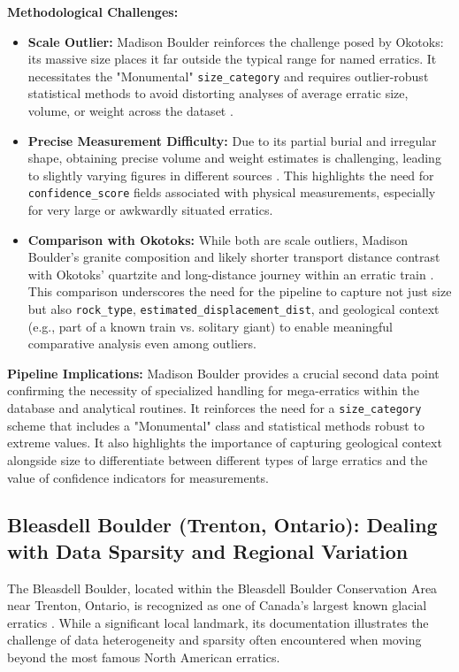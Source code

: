 \documentclass[
11pt, %
english, %
singlespacing, %
headsepline, %
]{MastersDoctoralThesis} %
\begin{document}
\textbf{Methodological Challenges:}
\begin{itemize}
    \item \textbf{Scale Outlier:} Madison Boulder reinforces the challenge posed by Okotoks: its massive size places it far outside the typical range for named erratics. It necessitates the "Monumental" \texttt{size\_category} and requires outlier-robust statistical methods to avoid distorting analyses of average erratic size, volume, or weight across the dataset \cite{Cuffey2010}.
    \item \textbf{Precise Measurement Difficulty:} Due to its partial burial and irregular shape, obtaining precise volume and weight estimates is challenging, leading to slightly varying figures in different sources \cite{NHMadisonBoulder, NPSMadisonBoulder}. This highlights the need for \texttt{confidence\_score} fields associated with physical measurements, especially for very large or awkwardly situated erratics.
    \item \textbf{Comparison with Okotoks:} While both are scale outliers, Madison Boulder's granite composition and likely shorter transport distance contrast with Okotoks' quartzite and long-distance journey within an erratic train \cite{AlbertaOkotoks, Goldthwait1925}. This comparison underscores the need for the pipeline to capture not just size but also \texttt{rock\_type}, \texttt{estimated\_displacement\_dist}, and geological context (e.g., part of a known train vs. solitary giant) to enable meaningful comparative analysis even among outliers.
\end{itemize}

\textbf{Pipeline Implications:} Madison Boulder provides a crucial second data point confirming the necessity of specialized handling for mega-erratics within the database and analytical routines. It reinforces the need for a \texttt{size\_category} scheme that includes a "Monumental" class and statistical methods robust to extreme values. It also highlights the importance of capturing geological context alongside size to differentiate between different types of large erratics and the value of confidence indicators for measurements.

\subsection{Bleasdell Boulder (Trenton, Ontario): Dealing with Data Sparsity and Regional Variation}
\label{subsec:bleasdell}

The Bleasdell Boulder, located within the Bleasdell Boulder Conservation Area near Trenton, Ontario, is recognized as one of Canada's largest known glacial erratics \cite{LTCBleasdell, Chapman1984}. While a significant local landmark, its documentation illustrates the challenge of data heterogeneity and sparsity often encountered when moving beyond the most famous North American erratics.
\end{document}
